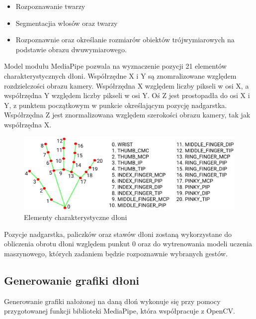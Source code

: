     \begin{itemize}
        \item Rozpoznawanie twarzy
        \item Segmentacjia włosów oraz twarzy
        \item Rozpoznawnie oraz określanie rozmiarów obiektów trójwymiarowych 
              na podstawie obrazu dwuwymiarowego. 
    \end{itemize}
    
    \quad Model modułu MediaPipe pozwala na wyznaczenie pozycji 21 elementów charakterystycznych dłoni. Współrzędne X i Y są znomralizowane względem rozdzielczości obrazu kamery. Współrzędna X względem liczby pikseli w osi X, a współrzędna Y względem liczby pikseli w osi Y. Oś Z jest prostopadła do osi X i Y, z punktem początkowym w punkcie określającym pozycję nadgarstka. Współrzędna Z jest znormalizowana względem szerokości obrazu kamery, tak jak współrzędna X. 
    
    \begin{figure}[H]
    \begin{center}
        \includegraphics[width=15cm]{../images/hand_landmarks.png}
        \caption{Elementy charakterystyczne dłoni}
    \end{center}
    \end{figure}
    
    \quad Pozycje nadgarstka, paliczków oraz stawów dłoni zostaną wykorzystane do obliczenia obrotu dłoni względem punkut 0 oraz do wytrenowania modeli uczenia maszynowego, których zadaniem będzie rozpoznawnie wybranych gestów. 
    
    \subsection{Generowanie grafiki dłoni}
    
    \quad Generowanie grafiki nałożonej na daną dłoń wykonuje się przy pomocy przygotowanej funkcji biblioteki MediaPipe, która współpracuje z OpenCV.   
    

